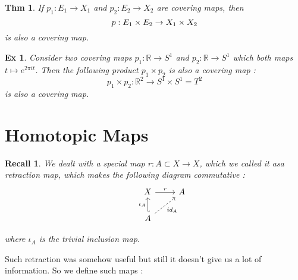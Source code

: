\documentclass[paper=a4, fontsize=11pt]{scrartcl}
\newtheorem{theorem}{Thm}
\newtheorem{example}{Ex}
\newtheorem*{recall}{Recall}
\begin{document}
\vspace{0.15in}

\begin{theorem}
If $p_1 : E_1 \to X_1$ and $p_2 : E_2 \to X_2$ are covering maps, then \\
\begin{equation}\nonumber
	p : E_1 \times E_2 \to X_1 \times X_2\\
\end{equation}
is also a covering map. 
\end{theorem}


\begin{example}
	Consider two covering maps $p_1 : \mathbb{R} \to S^1$ and $p_2 : \mathbb{R} \to S^1$ which both maps $t \mapsto e^{2\pi i t}$. Then the following product $p_1 \times p_2$ is also a covering map : 
	\begin{equation}\nonumber
		p_1 \times p_2 : \mathbb{R}^2 \to S^1 \times S^1 = T^2
	\end{equation}
	is also a covering map.
\end{example}

\vspace{0.15in}


\section{Homotopic Maps}
\vspace{0.15in}

\begin{recall}
	We dealt with a special map $r:A\subset X \to X$, which we called it asa retraction map, which makes the following diagram commutative : \\
	\[
	\begin{tikzcd}	
	& X \arrow[r,"r"] &A \\
	& A \arrow[u,hook',"\iota_A"] \arrow[dashrightarrow]{ru}[swap]{id_A}
	\end{tikzcd}	
	\]
	
	where $\iota_A$ is the trivial inclusion map.
\end{recall}

Such retraction was somehow useful but still it doesn't give us a lot of information. So we define such maps :

\vspace{0.15in}
\end{document}
